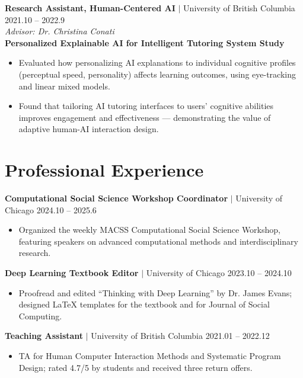 \documentclass[11pt,letterpaper]{article}
\newcommand{\project}[1]{\textbf{\textcolor{black!80}{#1}}}
\newcommand{\advisor}[1]{\textit{Advisor: #1}}
\begin{document}
\noindent\textbf{Research Assistant, Human-Centered AI} $|$ University of British Columbia \hfill 2021.10 -- 2022.9\\
\noindent\advisor{Dr. Christina Conati}\\[0.3em]
\noindent\project{Personalized Explainable AI for Intelligent Tutoring System Study}
\begin{itemize}
    \item Evaluated how personalizing AI explanations to individual cognitive profiles (perceptual speed, personality) affects learning outcomes, using eye-tracking and linear mixed models.
    \item Found that tailoring AI tutoring interfaces to users' cognitive abilities improves engagement and effectiveness --- demonstrating the value of adaptive human-AI interaction design.
\end{itemize}

\section*{Professional Experience}

\noindent\textbf{Computational Social Science Workshop Coordinator} $|$ University of Chicago \hfill 2024.10 -- 2025.6
\begin{itemize}
    \item Organized the weekly MACSS Computational Social Science Workshop, featuring speakers on advanced computational methods and interdisciplinary research.
\end{itemize}

\vspace{0.5em}

\noindent\textbf{Deep Learning Textbook Editor} $|$ University of Chicago \hfill 2023.10 -- 2024.10
\begin{itemize}
    \item Proofread and edited ``Thinking with Deep Learning'' by Dr. James Evans; designed LaTeX templates for the textbook and for Journal of Social Computing.
\end{itemize}

\vspace{0.5em}

\noindent\textbf{Teaching Assistant} $|$ University of British Columbia \hfill 2021.01 -- 2022.12
\begin{itemize}
    \item TA for Human Computer Interaction Methods and Systematic Program Design; rated 4.7/5 by students and received three return offers.
\end{itemize}
\end{document}
